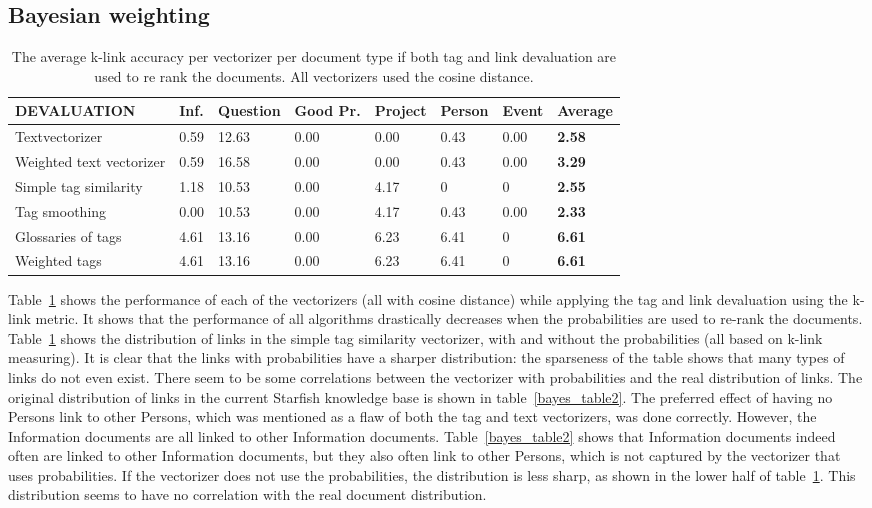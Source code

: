 \subsection{Bayesian weighting}
\begin{table}
\begin{tabular}{| l | l | l | l | l | l | l | l |}
\hline
DEVALUATION & Inf. &  Question &  Good Pr.& Project & Person &  Event & {\bf Average} \\
\hline
Textvectorizer & 0.59 & 12.63 & 0.00 & 0.00 & 0.43 & 0.00 & {\bf 2.58}\\
Weighted text vectorizer & 0.59 & 16.58 & 0.00 & 0.00 & 0.43 & 0.00 & {\bf 3.29} \\ 
Simple tag similarity & 1.18 & 10.53 & 0.00 & 4.17& 0 & 0 & {\bf 2.55}\\
Tag smoothing & 0.00 & 10.53 & 0.00 & 4.17 & 0.43 & 0.00 & {\bf 2.33}\\
Glossaries of tags & 4.61 & 13.16 & 0.00 & 6.23 & 6.41 & 0 & {\bf 6.61}\\
Weighted tags & 4.61 & 13.16 & 0.00 & 6.23 & 6.41 & 0 & {\bf 6.61}\\
\hline
\end{tabular}
\caption{The average k-link accuracy per vectorizer per document type if both tag and link devaluation are used to re rank the documents. All vectorizers used the cosine distance.}
\label{bayes_table1}
\end{table}

Table~\ref{bayes_table1} shows the performance of each of the vectorizers (all
with cosine distance) while applying the tag and link devaluation using the
k-link metric. It shows that the performance of all algorithms drastically
decreases when the probabilities are used to re-rank the documents. 
Table~\ref{bayes_table1}  shows the distribution of links in the simple tag
similarity vectorizer, with and without the probabilities (all based on k-link
measuring). It is clear that the links with probabilities have a sharper
distribution: the sparseness of the table shows that many types of links do not
even exist. There seem to be some correlations between the vectorizer with probabilities and the real distribution of links. The original distribution of links in the current Starfish knowledge base is shown in table~\ref{bayes_table2}. The preferred effect of having no Persons link to other Persons, which was mentioned as a flaw of both the tag and text vectorizers, was done correctly. However, the Information documents are all linked to other Information documents. Table~\ref{bayes_table2} shows that Information documents indeed often are linked to other Information documents, but they also often link to other Persons, which is not captured by the vectorizer that uses probabilities. If the vectorizer does not use the probabilities, the distribution is less sharp, as shown in the lower half of table~\ref{bayes_table1}. This distribution seems to have no correlation with the real document distribution.

